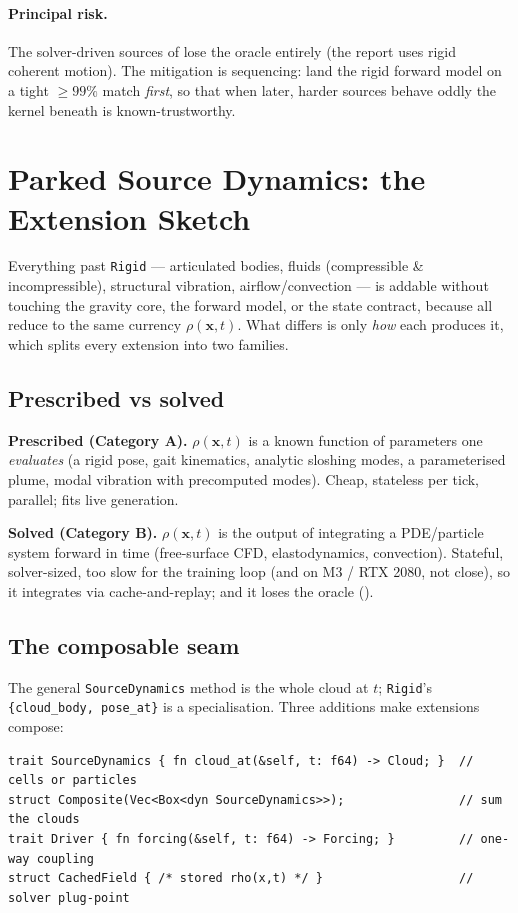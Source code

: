 \documentclass[11pt,a4paper]{article}
\theoremstyle{reqstyle}
\newcommand{\xv}{\mathbf{x}}
\begin{document}
\paragraph{Principal risk.} The solver-driven sources of  lose the oracle
entirely (the report uses rigid coherent motion). The mitigation is sequencing: land the
rigid forward model on a tight $\geq 99\%$ match \emph{first}, so that when later, harder
sources behave oddly the kernel beneath is known-trustworthy.

\appendix
\section{Parked Source Dynamics: the Extension Sketch}
\label{sec:parked}

Everything past \texttt{Rigid} --- articulated bodies, fluids (compressible \&
incompressible), structural vibration, airflow/convection --- is addable without touching
the gravity core, the forward model, or the state contract, because all reduce to the same
currency $\rho(\xv,t)$. What differs is only \emph{how} each produces it, which splits every
extension into two families.

\subsection{Prescribed vs solved}
\textbf{Prescribed (Category A).} $\rho(\xv,t)$ is a known function of parameters one
\emph{evaluates} (a rigid pose, gait kinematics, analytic sloshing modes, a parameterised
plume, modal vibration with precomputed modes). Cheap, stateless per tick, parallel; fits
live generation.

\textbf{Solved (Category B).} $\rho(\xv,t)$ is the output of integrating a PDE/particle
system forward in time (free-surface CFD, elastodynamics, convection). Stateful,
solver-sized, too slow for the training loop (and on M3 / RTX 2080, not close), so it
integrates via cache-and-replay; and it loses the oracle ().

\subsection{The composable seam}
The general \texttt{SourceDynamics} method is the whole cloud at $t$; \texttt{Rigid}'s
\texttt{\{cloud\_body, pose\_at\}} is a specialisation. Three additions make extensions
compose:
\begin{lstlisting}
trait SourceDynamics { fn cloud_at(&self, t: f64) -> Cloud; }  // cells or particles
struct Composite(Vec<Box<dyn SourceDynamics>>);                // sum the clouds
trait Driver { fn forcing(&self, t: f64) -> Forcing; }         // one-way coupling
struct CachedField { /* stored rho(x,t) */ }                   // solver plug-point
\end{lstlisting}
\end{document}
